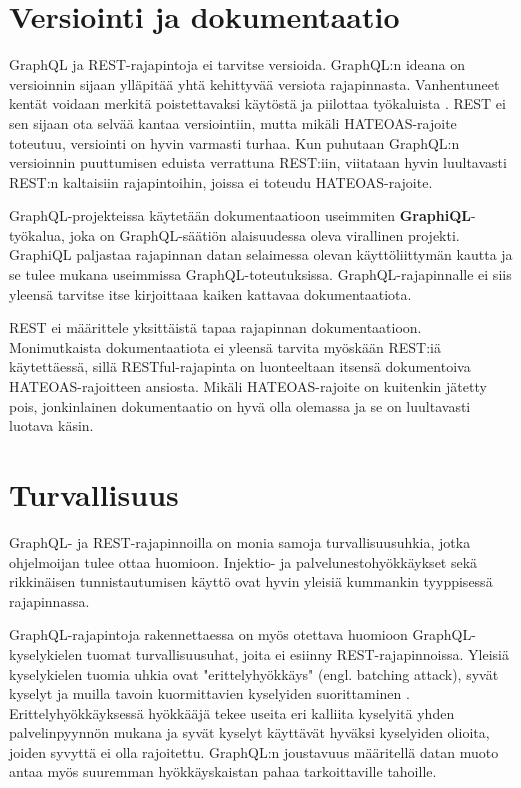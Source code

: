 
\section{Versiointi ja dokumentaatio}

GraphQL ja REST-rajapintoja ei tarvitse versioida. GraphQL:n ideana on versioinnin sijaan ylläpitää yhtä kehittyvää versiota rajapinnasta. Vanhentuneet kentät voidaan merkitä poistettavaksi käytöstä ja piilottaa työkaluista \cite{graphqlorg}. REST ei sen sijaan ota selvää kantaa versiointiin, mutta mikäli HATEOAS-rajoite toteutuu, versiointi on hyvin varmasti turhaa. Kun puhutaan GraphQL:n versioinnin puuttumisen eduista verrattuna REST:iin, viitataan hyvin luultavasti REST:n kaltaisiin rajapintoihin, joissa ei toteudu HATEOAS-rajoite.

GraphQL-projekteissa käytetään dokumentaatioon useimmiten \textbf{GraphiQL}-työkalua, joka on GraphQL-säätiön alaisuudessa oleva virallinen projekti. GraphiQL paljastaa rajapinnan datan selaimessa olevan käyttöliittymän kautta ja se tulee mukana useimmissa GraphQL-toteutuksissa. GraphQL-rajapinnalle ei siis yleensä tarvitse itse kirjoittaaa kaiken kattavaa dokumentaatiota. 

REST ei määrittele yksittäistä tapaa rajapinnan dokumentaatioon. Monimutkaista dokumentaatiota ei yleensä tarvita myöskään REST:iä käytettäessä, sillä RESTful-rajapinta on luonteeltaan itsensä dokumentoiva HATEOAS-rajoitteen ansiosta. Mikäli HATEOAS-rajoite on kuitenkin jätetty pois, jonkinlainen dokumentaatio on hyvä olla olemassa ja se on luultavasti luotava käsin.

\section{Turvallisuus}

GraphQL- ja REST-rajapinnoilla on monia samoja turvallisuusuhkia, jotka ohjelmoijan tulee ottaa huomioon. Injektio- ja palvelunestohyökkäykset sekä rikkinäisen tunnistautumisen käyttö ovat hyvin yleisiä kummankin tyyppisessä rajapinnassa. \cite{owasp-graphql, owasp-rest}

GraphQL-rajapintoja rakennettaessa on myös otettava huomioon GraphQL-kyselykielen tuomat turvallisuusuhat, joita ei esiinny REST-rajapinnoissa. Yleisiä kyselykielen tuomia uhkia ovat "erittelyhyökkäys" (engl. batching attack), syvät kyselyt ja muilla tavoin kuormittavien kyselyiden suorittaminen \cite{owasp-graphql}. Erittelyhyökkäyksessä hyökkääjä tekee useita eri kalliita kyselyitä yhden palvelinpyynnön mukana ja syvät kyselyt käyttävät hyväksi kyselyiden olioita, joiden syvyttä ei olla rajoitettu. GraphQL:n joustavuus määritellä datan muoto antaa myös suuremman hyökkäyskaistan pahaa tarkoittaville tahoille.

